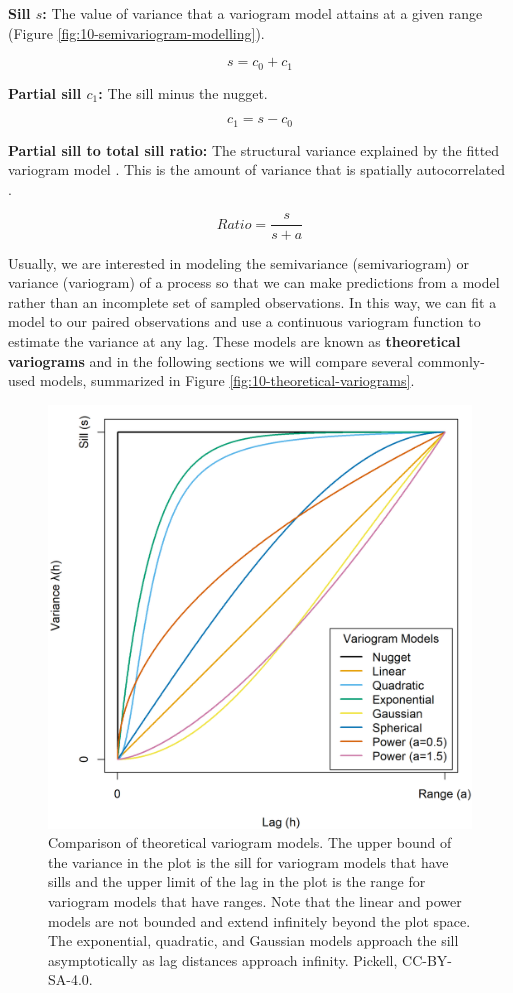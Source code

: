 \documentclass[
]{book}
\begin{document}
\textbf{Sill \(s\):} The value of variance that a variogram model attains at a given range (Figure \ref{fig:10-semivariogram-modelling}).

\[
s=c_0+c_1
\]

\textbf{Partial sill \(c_1\):} The sill minus the nugget.

\[
c_1=s-c_0
\]

\textbf{Partial sill to total sill ratio:} The structural variance explained by the fitted variogram model \citep{rossi_geostatistical_1992}. This is the amount of variance that is spatially autocorrelated \citep{rossi_geostatistical_1992}.

\[ Ratio =\frac {s}{s+a}\]

Usually, we are interested in modeling the semivariance (semivariogram) or variance (variogram) of a process so that we can make predictions from a model rather than an incomplete set of sampled observations. In this way, we can fit a model to our paired observations and use a continuous variogram function to estimate the variance at any lag. These models are known as \textbf{theoretical variograms} and in the following sections we will compare several commonly-used models, summarized in Figure \ref{fig:10-theoretical-variograms}.

\begin{figure}
\includegraphics[width=0.75\linewidth]{images/10-theoretical-variogram-models} \caption{Comparison of theoretical variogram models. The upper bound of the variance in the plot is the sill for variogram models that have sills and the upper limit of the lag in the plot is the range for variogram models that have ranges. Note that the linear and power models are not bounded and extend infinitely beyond the plot space. The exponential, quadratic, and Gaussian models approach the sill asymptotically as lag distances approach infinity. Pickell, CC-BY-SA-4.0.}\label{fig:10-theoretical-variogram-models}
\end{figure}
\end{document}
